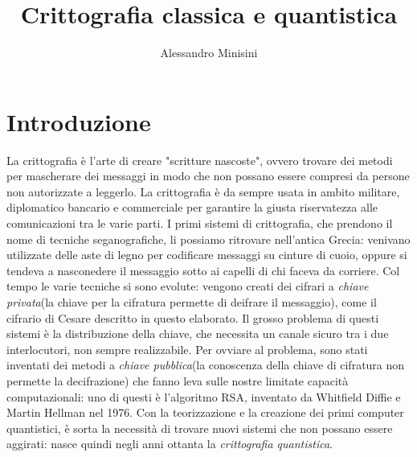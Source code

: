 \documentclass[italian,A4,12pt]{article}
\title{Crittografia classica e quantistica}
\author{Alessandro Minisini}
\affil{Liceo Scientifico Niccolò Copernico}
\date{}
\begin{document}
  \maketitle
  \newpage
  \tableofcontents
  \newpage
  \section{Introduzione}
  La crittografia è l'arte di creare "scritture nascoste", ovvero trovare dei metodi per mascherare dei messaggi in modo che non possano essere compresi da persone non autorizzate a leggerlo. La crittografia è da sempre usata in ambito militare, diplomatico bancario e commerciale per garantire la giusta riservatezza alle comunicazioni tra le varie parti. I primi sistemi di crittografia, che prendono il nome di tecniche seganografiche, li possiamo ritrovare nell'antica Grecia: venivano utilizzate delle aste di legno per codificare messaggi su cinture di cuoio, oppure si tendeva a nasconedere il messaggio sotto ai capelli di chi faceva da corriere.
  Col tempo le varie tecniche si sono evolute: vengono creati dei cifrari a \textit{chiave privata}(la chiave per la cifratura permette di deifrare il messaggio), come il cifrario di Cesare descritto in questo elaborato.
  Il grosso problema di questi sistemi è la distribuzione della chiave, che necessita un canale sicuro tra i due interlocutori, non sempre realizzabile.
  Per ovviare al problema, sono stati inventati dei metodi a \textit{chiave pubblica}(la conoscenza della chiave di cifratura non permette la decifrazione) che fanno leva sulle nostre limitate capacità computazionali: uno di questi è l'algoritmo RSA, inventato da Whitfield Diffie e Martin Hellman nel 1976.
  Con la teorizzazione e la creazione dei primi computer quantistici, è sorta la necessità di trovare nuovi sistemi che non possano essere aggirati: nasce quindi negli anni ottanta la \textit{crittografia quantistica}.
\end{document}
